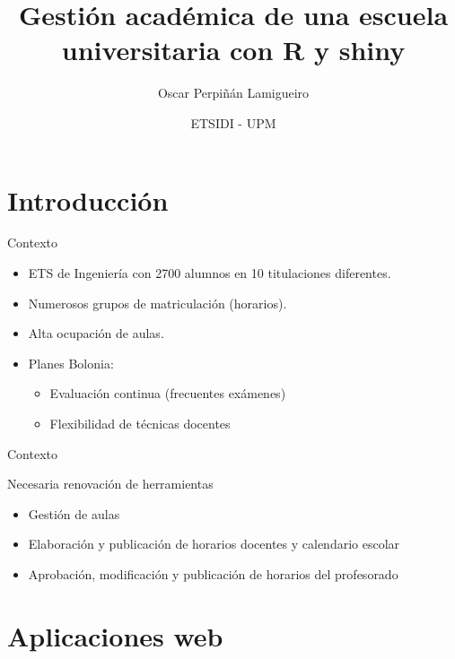 \documentclass[spanish, xcolor={usenames,svgnames,dvipsnames}]{beamer}
\author{Oscar Perpiñán Lamigueiro}
\date{ETSIDI - UPM}
\title{Gestión académica de una escuela universitaria con R y shiny}
\begin{document}
\maketitle

\section{Introducción}
\label{sec:org8c3adba}

\begin{frame}[label={sec:org570d75b}]{Contexto}
\begin{itemize}
\item ETS de Ingeniería con 2700 alumnos en 10 titulaciones diferentes.
\item Numerosos grupos de matriculación (horarios).
\item Alta ocupación de aulas.
\item Planes Bolonia:
\begin{itemize}
\item Evaluación continua (frecuentes exámenes)
\item Flexibilidad de técnicas docentes
\end{itemize}
\end{itemize}
\end{frame}

\begin{frame}[label={sec:org77e4535}]{Contexto}
\begin{block}{Necesaria renovación de herramientas}
\begin{itemize}
\item Gestión de aulas
\item Elaboración y publicación de horarios docentes y calendario escolar
\item Aprobación, modificación y publicación de horarios del profesorado
\end{itemize}
\end{block}
\end{frame}


\section{Aplicaciones web}
\label{sec:org26d11f5}
\end{document}
